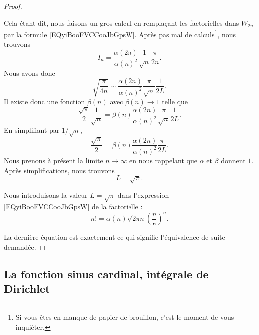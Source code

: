 \begin{proof}
\begin{subproof}
		Cela étant dit, nous faisons un gros calcul en remplaçant les factorielles dans \( W_{2n}\) par la formule \eqref{EQyiBooFVCCooJbGpsW}. Après pas mal de calculs\footnote{Si vous êtes en manque de papier de brouillon, c'est le moment de vous inquiéter.}, nous trouvons
		\begin{equation}
			I_n=\frac{ \alpha(2n) }{ \alpha(n)^2 }\frac{1}{ \sqrt{ n } }\frac{ \pi }{ 2n }.
		\end{equation}
		Nous avons donc
		\begin{equation}
			\sqrt{ \frac{ \pi }{ 4n } }\sim \frac{ \alpha(2n) }{ \alpha(n)^2 }\frac{ \pi }{ \sqrt{ n } }\frac{1}{ 2L }.
		\end{equation}
		Il existe donc une fonction \( \beta(n)\) avec \( \beta(n)\to 1\) telle que
		\begin{equation}
			\frac{ \sqrt{ \pi } }{2}\frac{1}{ \sqrt{ n } }=\beta(n)\frac{ \alpha(2n) }{ \alpha(n)^2 }\frac{ \pi }{ \sqrt{ n } }\frac{1}{ 2L }.
		\end{equation}
		En simplifiant par \( 1/\sqrt{ n }\),
		\begin{equation}
			\frac{ \sqrt{ \pi } }{2}=\beta(n)\frac{ \alpha(2n) }{ \alpha(n)^2 }\frac{\pi}{ 2L }.
		\end{equation}
		Nous prenons à présent la limite \( n\to \infty\) en nous rappelant que \( \alpha\) et \( \beta \) donnent \( 1\). Après simplifications, nous trouvons
		\begin{equation}
			L=\sqrt{ \pi }.
		\end{equation}

		\spitem[La fin]
		Nous introduisons la valeur \( L=\sqrt{ \pi }\) dans l'expression \eqref{EQyiBooFVCCooJbGpsW} de la factorielle :
		\begin{equation}
			n!=\alpha(n)\sqrt{ 2\pi n }\left( \frac{ n }{ e } \right)^n.
		\end{equation}
	\end{subproof}
	La dernière équation est exactement ce qui signifie l'équivalence de suite demandée.
\end{proof}

\subsection{La fonction sinus cardinal, intégrale de Dirichlet}

